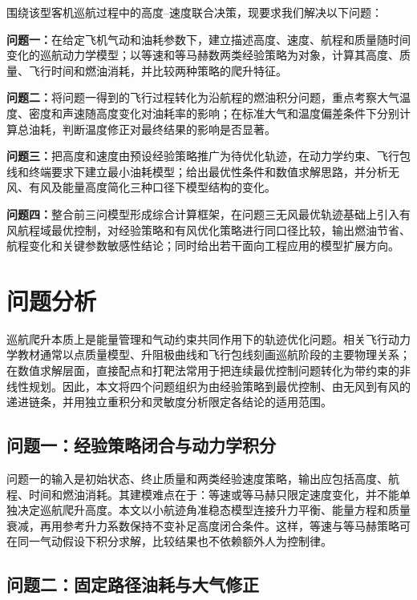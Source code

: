 \documentclass[withoutpreface,bwprint]{cumcmthesis}
\begin{document}
围绕该型客机巡航过程中的高度--速度联合决策，现要求我们解决以下问题：

\textbf{问题一：}在给定飞机气动和油耗参数下，建立描述高度、速度、航程和质量随时间变化的巡航动力学模型；以等速和等马赫数两类经验策略为对象，计算其高度、质量、飞行时间和燃油消耗，并比较两种策略的爬升特征。

\textbf{问题二：}将问题一得到的飞行过程转化为沿航程的燃油积分问题，重点考察大气温度、密度和声速随高度变化对油耗率的影响；在标准大气和温度偏差条件下分别计算总油耗，判断温度修正对最终结果的影响是否显著。

\textbf{问题三：}把高度和速度由预设经验策略推广为待优化轨迹，在动力学约束、飞行包线和终端要求下建立最小油耗模型；给出最优性条件和数值求解思路，并分析无风、有风及能量高度简化三种口径下模型结构的变化。

\textbf{问题四：}整合前三问模型形成综合计算框架，在问题三无风最优轨迹基础上引入有风航程域最优控制，对经验策略和有风优化策略进行同口径比较，输出燃油节省、航程变化和关键参数敏感性结论；同时给出若干面向工程应用的模型扩展方向。

\section{问题分析}

巡航爬升本质上是能量管理和气动约束共同作用下的轨迹优化问题。相关飞行动力学教材通常以点质量模型、升阻极曲线和飞行包线刻画巡航阶段的主要物理关系\cite{kuang2012,xu2023}；在数值求解层面，直接配点和打靶法常用于把连续最优控制问题转化为带约束的非线性规划\cite{jia2024,optimal_control2017}。因此，本文将四个问题组织为由经验策略到最优控制、由无风到有风的递进链条，并用独立重积分和灵敏度分析限定各结论的适用范围。

\subsection{问题一：经验策略闭合与动力学积分}

问题一的输入是初始状态、终止质量和两类经验速度策略，输出应包括高度、航程、时间和燃油消耗。其建模难点在于：等速或等马赫只限定速度变化，并不能单独决定巡航爬升高度。本文以小航迹角准稳态模型连接升力平衡、能量方程和质量衰减，再用参考升力系数保持不变补足高度闭合条件。这样，等速与等马赫策略可在同一气动假设下积分求解，比较结果也不依赖额外人为控制律。

\subsection{问题二：固定路径油耗与大气修正}
\end{document}
